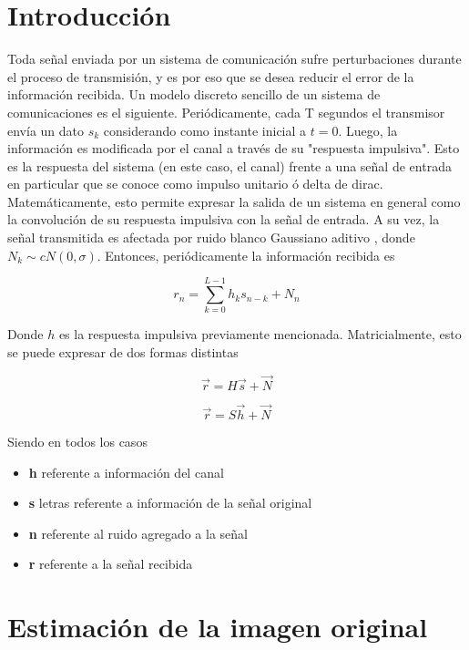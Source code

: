 
%
\section{Introducci\'on}
Toda se\~nal enviada por un sistema de comunicaci\'on sufre perturbaciones durante el proceso de transmisi\'on, y es por eso que se desea reducir el error de la informaci\'on recibida.
Un modelo discreto sencillo de un sistema de comunicaciones es el siguiente. Peri\'odicamente, cada T segundos el transmisor env\'ia un dato $s_k$ considerando como instante inicial a $t = 0$. Luego, la informaci\'on es modificada por el canal a través de su "respuesta impulsiva". Esto es la respuesta del sistema (en este caso, el canal) frente a una se\~nal de entrada en particular que se conoce como impulso unitario \'o delta de dirac. Matem\'aticamente, esto permite expresar la salida de un sistema en general como la convoluci\'on de su respuesta impulsiva con la se\~nal de entrada.
A su vez, la señal transmitida es afectada por ruido blanco Gaussiano aditivo , donde $N_k \sim cN(0,\sigma)$. Entonces, peri\'odicamente la informaci\'on recibida es 

\begin{equation*} 
r_n = \sum_{k=0}^{L-1} h_k s_{n-k} + N_n 
\end{equation*} 

Donde $h$  es la respuesta impulsiva previamente mencionada. Matricialmente, esto se puede expresar de dos formas distintas

\begin{equation*}  
\vec{r} = H \vec{s} + \vec{N} 
\end{equation*} 

\begin{equation*} 
\vec{r} = S \vec{h} + \vec{N} 
\end{equation*} 

Siendo en todos los casos 
\begin{itemize}
	\item \textbf{h} referente a información del canal
	\item \textbf{s} letras referente a información de la señal original
	\item \textbf{n} referente al ruido agregado a la señal
	\item \textbf{r} referente a la señal recibida
\end{itemize}
	

\section{Estimación de la imagen original}


